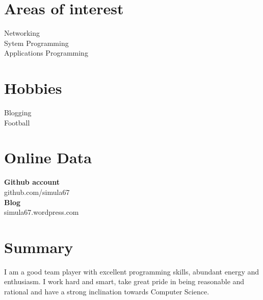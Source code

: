 \documentclass[line,margin]{res}
\begin{document}
\begin{resume}
\section{Areas of interest}
Networking\\
Sytem Programming\\
Applications Programming\\

\section{Hobbies}
Blogging\\
Football\\

\section{Online Data}
{\bf Github account}\\
github.com/simula67\\
{\bf Blog}\\
simula67.wordpress.com

\section{Summary}
I am a good team player with excellent programming skills, abundant energy and enthusiasm. I work hard and smart, take great pride in being reasonable and rational and have a strong inclination towards Computer Science.

\end{resume}
\end{document}
